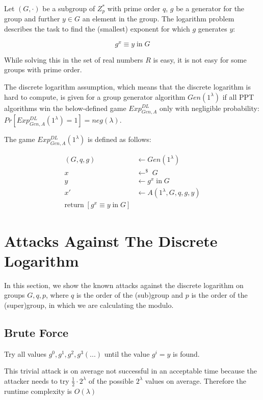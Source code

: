 Let $(G, \cdot)$ be a subgroup of $Z_p^*$ with prime order $q$, $g$ be a generator for the group and further $y \in G$ an element in the group.
The logarithm problem describes the task to find the (smallest) exponent for which $g$ generates $y$:

$$
    g^x \equiv y \; \text{in} \; G
$$

While solving this in the set of real numbers $R$ is easy, it is not easy for some groups with prime order.

The discrete logarithm assumption, which means that the discrete logarithm is hard to compute, is given for a group generator algorithm $Gen(1^\lambda)$ if all PPT algorithms win the below-defined game $Exp^{DL}_{Gen,A}$ only with negligible probability: $Pr[Exp^{DL}_{Gen,A}(1^\lambda) = 1] = neg(\lambda)$.

The game $Exp^{DL}_{Gen,A}(1^\lambda)$ is defined as follows:

\begin{align*}
    (G, q, g) & \leftarrow Gen(1^\lambda)           \\
    x         & \leftarrow^\$ \; G                  \\
    y         & \leftarrow g^x \; \text{in} \; G    \\
    x'        & \leftarrow A(1^\lambda, G, q, g, y) \\
    \text{return} \; [g^x \equiv y \; \text{in} \; G ]
\end{align*}

\section{Attacks Against The Discrete Logarithm}

In this section, we show the known attacks against the discrete logarithm on groups $G, q, p$, where $q$ is the order of the (sub)group and $p$ is the order of the (super)group, in which we are calculating the modulo.

\subsection{Brute Force}

Try all values $g^0, g^1, g^2, g^3 (...)$ until the value $g^i = y$ is found.

This trivial attack is on average not successful in an acceptable time because the attacker needs to try $\frac{1}{2} \cdot 2^\lambda$ of the possible $2^\lambda$ values on average. Therefore the runtime complexity is $O(\lambda)$

